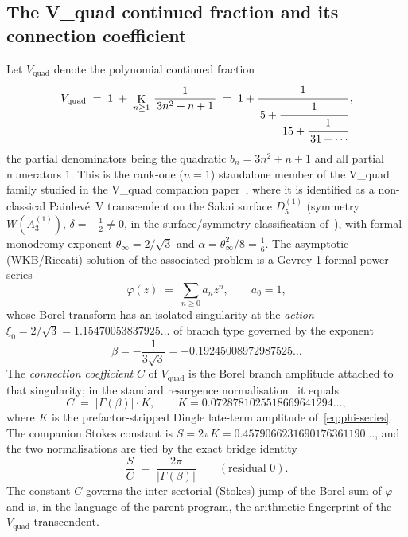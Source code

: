 \documentclass[11pt,reqno]{amsart}
\theoremstyle{plain}
\theoremstyle{definition}
\newcommand{\Vquad}{V_{\mathrm{quad}}}
\newcommand{\xizero}{\xi_0}
\providecommand{\C}{}\renewcommand{\C}{C}
\DeclareMathOperator*{\K}{K}
\begin{document}
\subsection{The V\_quad continued fraction and its connection coefficient}
Let $\Vquad$ denote the polynomial continued fraction
\begin{equation}\label{eq:vquad-pcf}
  \Vquad \;=\; 1 \;+\; \K_{n\ge 1}\,\frac{1}{\,3n^{2}+n+1\,}
  \;=\; 1+\cfrac{1}{\,5+\cfrac{1}{\,15+\cfrac{1}{\,31+\cdots}}}\,,
\end{equation}
the partial denominators being the quadratic $b_n=3n^2+n+1$ and all partial numerators $1$.
This is the rank-one ($n=1$) standalone member of the V\_quad family studied in the V\_quad
companion paper~\cite{Vquad}, where it is identified as a non-classical Painlev\'e~V
transcendent on the Sakai surface $D_5^{(1)}$ (symmetry $W(A_3^{(1)})$, $\delta=-\tfrac12\ne0$,
in the surface/symmetry classification of~\cite{SakaiClass}),
with formal monodromy exponent $\theta_\infty=2/\sqrt3$ and $\alpha=\theta_\infty^2/8=\tfrac16$.
The asymptotic (WKB/Riccati) solution of the associated problem is a Gevrey-1 formal power
series
\begin{equation}\label{eq:phi-series}
  \varphi(z)\;=\;\sum_{n\ge 0} a_n z^n ,\qquad a_0=1,
\end{equation}
whose Borel transform has an isolated singularity at the \emph{action}
$\xizero=2/\sqrt3=1.15470053837925\ldots$ of branch type governed by the exponent
\begin{equation}\label{eq:beta}
  \beta=-\frac{1}{3\sqrt3}=-0.19245008972987525\ldots
\end{equation}
The \emph{connection coefficient} $\C$ of $\Vquad$ is the Borel branch amplitude attached to
that singularity; in the standard resurgence normalisation~\cite{Dingle,BerryHowls,StokesNote}
it equals
\begin{equation}\label{eq:C-skeleton}
  \C \;=\; \lvert\Gamma(\beta)\rvert\cdot K,\qquad
  K=0.0728781025518669641294\ldots,
\end{equation}
where $K$ is the prefactor-stripped Dingle late-term amplitude of~\eqref{eq:phi-series}. The
companion Stokes constant is $S=2\pi K=0.4579066231690176361190\ldots$, and the two normalisations
are tied by the exact bridge identity
\begin{equation}\label{eq:bridge}
  \frac{S}{\C}\;=\;\frac{2\pi}{\lvert\Gamma(\beta)\rvert}\qquad(\text{residual }0).
\end{equation}
The constant $\C$ governs the inter-sectorial (Stokes) jump of the Borel sum of $\varphi$ and is,
in the language of the parent program, the arithmetic fingerprint of the $\Vquad$ transcendent.
\end{document}

